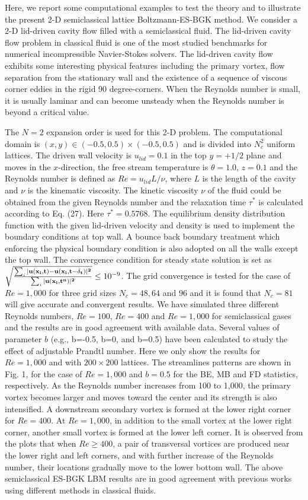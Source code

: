 \documentclass[doublecol]{epl2}
\begin{document}
Here, we report some computational examples to test the theory and to illustrate the present 2-D semiclassical lattice Boltzmann-ES-BGK method. We consider a 2-D lid-driven cavity flow filled with a semiclassical fluid. The lid-driven cavity flow problem in classical fluid is one of the most studied benchmarks for numerical incompressible Navier-Stokes solvers.  The lid-driven cavity flow exhibits some interesting physical features including the primary vortex, flow separation from the stationary wall and the existence of a sequence of viscous corner eddies in the rigid 90 degree-corners. When the Reynolds number is small, it is usually laminar and can become unsteady when the Reynolds number is beyond a critical value.

The $N=2$ expansion order is used for this 2-D problem. The computational domain is $(x,y) \in  (-0.5,0.5)\times(-0.5,0.5)$ and is divided into $N_c^2$ uniform lattices.   The driven wall velocity is $u_{lid}=0.1$ in the top $y=+1/2$ plane and moves in the $x$-direction, the free stream temperature is $\theta=1.0$, $z=0.1$ and the Reynolds number is defined as $Re =u_{lid} L/\nu$, where $L$ is the length of the cavity and $\nu$ is the kinematic viscosity.   The kinetic viscosity $\nu$ of the fluid could be obtained from the given Reynolds number and the relaxation time $\tau^*$ is calculated according to Eq. (27).  Here  $\tau^*=0.5768$.  The equilibrium density distribution function with the given lid-driven velocity and density is used to implement the boundary conditions at top wall.  A bounce back boundary treatment which enforcing the physical boundary condition is also adopted on all the walls except the top wall.
The convergence condition for steady state solution is set as $ \sqrt{ \frac{ \sum_i |\bf{u} (\bf{x}_i, t)-\bf{u} (\bf{x}_i, t-\delta_t)|^2}{\sum_i |\bf{u} (\bf{x}_i, t^n)|^2 } } \leq 10^{-9}$.  The grid convergence is tested for the case of $Re=1,000$ for three grid sizes $N_c=48, 64$ and $96$ and it is found that $N_c=81$ will give accurate and convergent results.  We have simulated three different Reynolds numbers, $Re=100$, $Re=400$ and $Re=1,000$ for semiclassical gases and the results are in good agreement with available data.  Several values of parameter $b$ (e.g., b=-0.5, b=0, and b=0.5) have been calculated to study the effect of adjustable Prandtl number.  Here we only show the results for $Re=1,000$ and with $200 \times 200$ lattices.   The streamlines patterns are shown in Fig. 1, for the case of $Re=1,000$ and $b=0.5$ for the BE, MB and FD statistics, respectively.
As the Reynolds number increases from 100 to 1,000, the primary vortex becomes larger and moves toward the center and its strength is also intensified. A downstream secondary vortex is formed at the lower right corner for $Re=400$.  At $Re=1,000$, in addition to the small vortex at the lower right corner, another small vortex is formed at the lower left corner. It is observed from the plots that when $Re \ge 400$, a pair of transversal vortices are produced near the lower right and left corners, and with further increase of the Reynolds number, their locations gradually move to the lower bottom wall. The above semiclassical ES-BGK LBM results are in good agreement with previous works \cite{Yang1998, YuD2003, Alben2005} using different methods in classical fluids.
\end{document}
